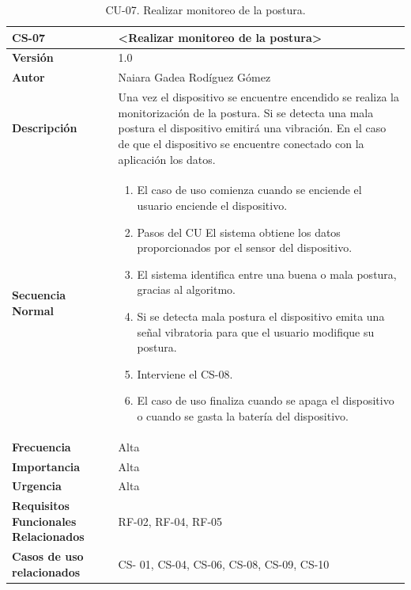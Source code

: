 \begin{table}[h!]
\centering
\begin{tabular}{ |m{3cm}|m{11cm}|  } 
\hline
\cellcolor[HTML]{B9E3F0}\textbf{CS-07} & \cellcolor[HTML]{B9E3F0}\textbf{<Realizar monitoreo de la postura>}\\

\hline
\cellcolor[HTML]{EFEFEF}\textbf{Versión}             & 1.0  \\
\hline
\cellcolor[HTML]{EFEFEF}\textbf{Autor}                & Naiara Gadea Rodíguez Gómez\\
\hline
\cellcolor[HTML]{EFEFEF}\textbf{Descripción}                & {Una vez el dispositivo se encuentre encendido se realiza la monitorización de la postura. Si se detecta una mala postura el dispositivo emitirá una vibración. En el caso de que el dispositivo se encuentre conectado con la aplicación los datos.}\\
\hline
\cellcolor[HTML]{EFEFEF}\textbf{Secuencia \newline Normal}                &                 
        \begin{enumerate}
			\def\labelenumi{\arabic{enumi}.}
			\tightlist
			\item El caso de uso comienza cuando se enciende el usuario enciende el dispositivo. 
			\item Pasos del CU El sistema obtiene los datos proporcionados por el sensor del dispositivo. 
                \item El sistema identifica entre una buena o mala postura, gracias al algoritmo. 
                \item Si se detecta mala postura el dispositivo emita una señal vibratoria para que el usuario modifique su postura.
                \item Interviene el CS-08. 
                \item El caso de uso finaliza cuando se apaga el dispositivo o cuando se gasta la batería del dispositivo.
		\end{enumerate}\\
\hline
\cellcolor[HTML]{EFEFEF}\textbf{Frecuencia}                & Alta\\
\hline
\cellcolor[HTML]{EFEFEF}\textbf{Importancia}                & Alta\\
\hline
\cellcolor[HTML]{EFEFEF}\textbf{Urgencia}                & Alta\\
\hline
\cellcolor[HTML]{EFEFEF}\textbf{Requisitos Funcionales Relacionados}                & {RF-02, RF-04, RF-05 }\\
\hline
\cellcolor[HTML]{EFEFEF}\textbf{Casos de uso relacionados}                & {CS- 01, CS-04, CS-06, CS-08, CS-09, CS-10 }\\
\hline
\end{tabular}
\caption{CU-07. Realizar monitoreo de la postura.}
\end{table}

